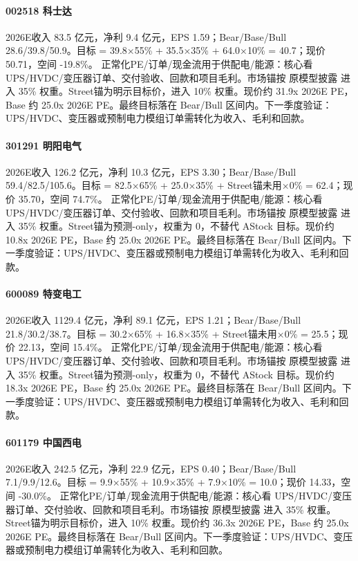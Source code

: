 \paragraph{002518 科士达} 2026E收入 83.5 亿元，净利 9.4 亿元，EPS 1.59；Bear/Base/Bull 28.6/39.8/50.9。目标 = 39.8×55\% + 35.5×35\% + 64.0×10\% = 40.7；现价 50.71，空间 -19.8\%。 正常化PE/订单/现金流用于供配电/能源：核心看 UPS/HVDC/变压器订单、交付验收、回款和项目毛利。市场锚按 原模型披露 进入 35\% 权重。Street锚为明示目标价，进入 10\% 权重。现价约 31.9x 2026E PE，Base 约 25.0x 2026E PE。最终目标落在 Bear/Bull 区间内。下一季度验证：UPS/HVDC、变压器或预制电力模组订单需转化为收入、毛利和回款。
\paragraph{301291 明阳电气} 2026E收入 126.2 亿元，净利 10.3 亿元，EPS 3.30；Bear/Base/Bull 59.4/82.5/105.6。目标 = 82.5×65\% + 25.0×35\% + Street锚未用×0\% = 62.4；现价 35.70，空间 74.7\%。 正常化PE/订单/现金流用于供配电/能源：核心看 UPS/HVDC/变压器订单、交付验收、回款和项目毛利。市场锚按 原模型披露 进入 35\% 权重。Street锚为预测-only，权重为 0，不替代 AStock 目标。现价约 10.8x 2026E PE，Base 约 25.0x 2026E PE。最终目标落在 Bear/Bull 区间内。下一季度验证：UPS/HVDC、变压器或预制电力模组订单需转化为收入、毛利和回款。
\paragraph{600089 特变电工} 2026E收入 1129.4 亿元，净利 89.1 亿元，EPS 1.21；Bear/Base/Bull 21.8/30.2/38.7。目标 = 30.2×65\% + 16.8×35\% + Street锚未用×0\% = 25.5；现价 22.13，空间 15.4\%。 正常化PE/订单/现金流用于供配电/能源：核心看 UPS/HVDC/变压器订单、交付验收、回款和项目毛利。市场锚按 原模型披露 进入 35\% 权重。Street锚为预测-only，权重为 0，不替代 AStock 目标。现价约 18.3x 2026E PE，Base 约 25.0x 2026E PE。最终目标落在 Bear/Bull 区间内。下一季度验证：UPS/HVDC、变压器或预制电力模组订单需转化为收入、毛利和回款。
\paragraph{601179 中国西电} 2026E收入 242.5 亿元，净利 22.9 亿元，EPS 0.40；Bear/Base/Bull 7.1/9.9/12.6。目标 = 9.9×55\% + 10.9×35\% + 7.9×10\% = 10.0；现价 14.33，空间 -30.0\%。 正常化PE/订单/现金流用于供配电/能源：核心看 UPS/HVDC/变压器订单、交付验收、回款和项目毛利。市场锚按 原模型披露 进入 35\% 权重。Street锚为明示目标价，进入 10\% 权重。现价约 36.3x 2026E PE，Base 约 25.0x 2026E PE。最终目标落在 Bear/Bull 区间内。下一季度验证：UPS/HVDC、变压器或预制电力模组订单需转化为收入、毛利和回款。
